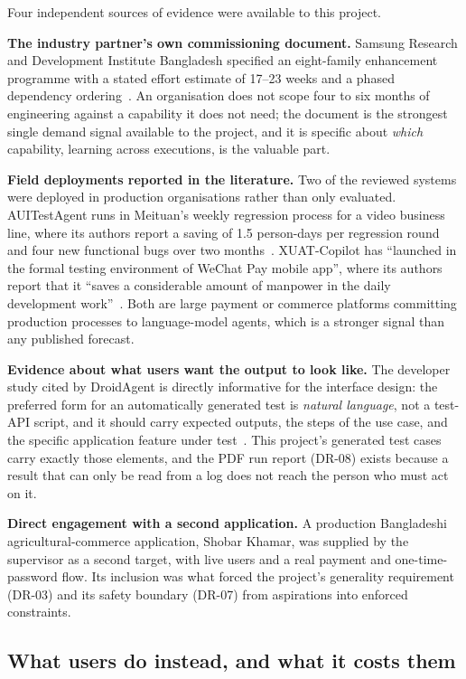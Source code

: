Four independent sources of evidence were available to this project.

\textbf{The industry partner's own commissioning document.} Samsung Research and
Development Institute Bangladesh specified an eight-family enhancement
programme with a stated effort estimate of 17--23 weeks and a phased dependency
ordering~\cite{etatr}. An organisation does not scope four to six months of
engineering against a capability it does not need; the document is the
strongest single demand signal available to the project, and it is specific
about \emph{which} capability, learning across executions, is the valuable
part.

\textbf{Field deployments reported in the literature.} Two of the reviewed
systems were deployed in production organisations rather than only evaluated.
AUITestAgent runs in Meituan's weekly regression process for a video business
line, where its authors report a saving of 1.5 person-days per regression round
and four new functional bugs over two months~\cite{auitestagent}. XUAT-Copilot
has ``launched in the formal testing environment of WeChat Pay mobile app'',
where its authors report that it ``saves a considerable amount of manpower in
the daily development work''~\cite{xuatcopilot}. Both are large payment or
commerce platforms committing production processes to language-model agents,
which is a stronger signal than any published forecast.

\textbf{Evidence about what users want the output to look like.} The developer
study cited by DroidAgent is directly informative for the interface design: the
preferred form for an automatically generated test is \emph{natural language},
not a test-API script, and it should carry expected outputs, the steps of the
use case, and the specific application feature under test~\cite{droidagent}.
This project's generated test cases carry exactly those elements, and the PDF
run report (DR-08) exists because a result that can only be read from a log
does not reach the person who must act on it.

\textbf{Direct engagement with a second application.} A production Bangladeshi
agricultural-commerce application, Shobar Khamar, was supplied by the supervisor as a second
target, with live users and a real payment and one-time-password flow. Its
inclusion was what forced the project's generality requirement (DR-03) and its
safety boundary (DR-07) from aspirations into enforced constraints.

\subsection*{What users do instead, and what it costs them}

